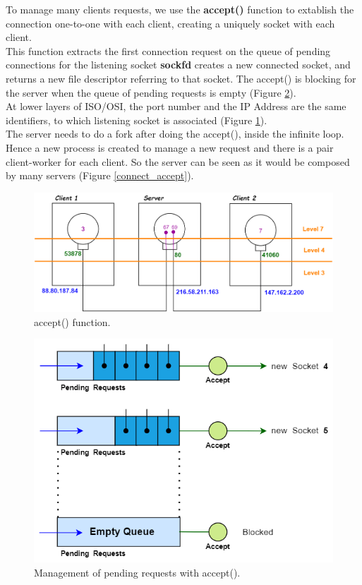 To manage many clients requests, we use the \textbf{accept()} function to extablish the connection one-to-one with each client, creating a uniquely socket with each client.\\
This function extracts the  first   connection request on the queue of pending connections for the listening socket \textbf{sockfd} creates a new connected socket, and returns a new file descriptor  referring  to that socket. The accept() is blocking for the server when the queue of pending requests is empty (Figure \ref{pending_accept}).\\
At lower layers of ISO/OSI, the port number and the IP Address are the same identifiers, to which listening socket is associated (Figure \ref{accept}).\\
The server needs to do a fork after doing the accept(), inside the infinite loop. Hence a new process is created to manage a new request and there is a pair client-worker for each client. So the server can be seen as it would be composed by many servers (Figure \ref{connect_accept}). 
 
\begin{figure}[h]
\centering
\includegraphics[scale=0.4]{Images/NetworkC/accept}\caption{\footnotesize{accept() function.}}\label{accept}
\end{figure}

\begin{figure}[h]
\centering
\includegraphics[scale=0.4]{Images/NetworkC/pending_accept}\caption{\footnotesize{Management of pending requests with accept().}}\label{pending_accept}
\end{figure}

